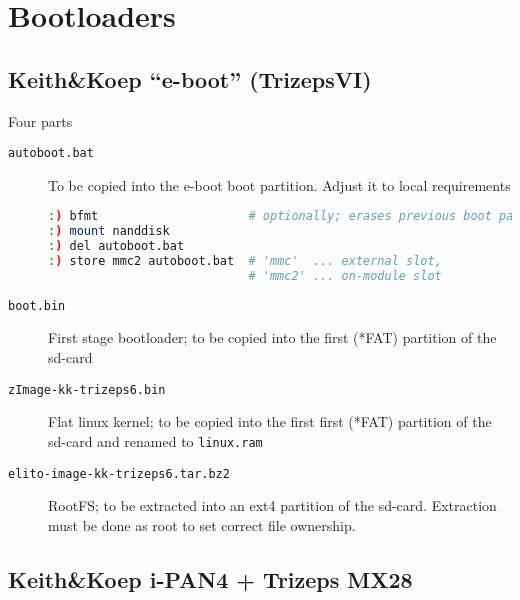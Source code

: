 \chapter{Bootloaders}

\section{Keith\&Koep ``e-boot'' (TrizepsVI)}

Four parts

\begin{description}
\item[\texttt{autoboot.bat}] To be copied into the e-boot boot
  partition. Adjust it to local requirements
\begin{lstlisting}[language=sh]
:) bfmt                     # optionally; erases previous boot partition
:) mount nanddisk
:) del autoboot.bat
:) store mmc2 autoboot.bat  # 'mmc'  ... external slot,
                            # 'mmc2' ... on-module slot
\end{lstlisting}
\item[\texttt{boot.bin}] First stage bootloader; to be copied into the first
  (*FAT) partition of the sd-card
\item[\texttt{zImage-kk-trizeps6.bin}] Flat linux kernel; to be copied
  into the first first (*FAT) partition of the sd-card and renamed to
  \texttt{linux.ram}
\item[\texttt{elito-image-kk-trizeps6.tar.bz2}] RootFS; to be
  extracted into an ext4 partition of the sd-card. Extraction must be
  done as root to set correct file ownership.
\end{description}

\section{Keith\&Koep i-PAN4 + Trizeps MX28}

